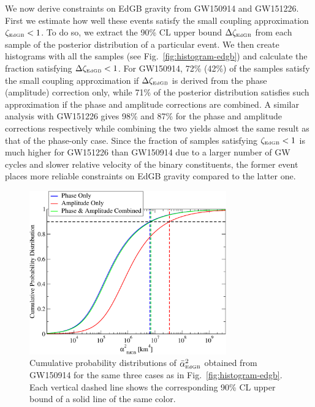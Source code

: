 \documentclass[prd,twocolumn,nofootinbib]{revtex4-1}
\newcommand{\EDGB}{{\mbox{\tiny EdGB}}}
\begin{document}
We now derive constraints on EdGB gravity from GW150914 and GW151226. First we estimate how well these events satisfy the small coupling approximation $\zeta_{\EDGB}<1$. To do so, we extract the 90\% CL upper bound $\Delta\zeta_{\EDGB}$ from each sample of the posterior distribution of a particular event. We then create histograms with all the samples (see Fig.~\ref{fig:histogram-edgb}) and calculate the fraction satisfying $\Delta\zeta_{\EDGB}<1$.  For GW150914, 72\% (42\%) of the samples satisfy the small coupling approximation if $\Delta\zeta_{\EDGB}$ is derived from the phase (amplitude) correction only, while 71\% of the posterior distribution satisfies such approximation if the phase and amplitude corrections are combined. A similar analysis with GW151226 gives 98\% and 87\% for the phase and amplitude corrections respectively while combining the two yields almost the same result as that of the phase-only case. Since the fraction of samples satisfying $\zeta_{\EDGB}<1$ is much higher for GW151226 than GW150914 due to a larger number of GW cycles and slower relative velocity of the binary constituents, the former event places more reliable constraints on EdGB gravity compared to the latter one.


\begin{figure}[htb]
\includegraphics[width=8.5cm]{edgb-gw150914.pdf}
\caption{Cumulative probability distributions of $\bar{\alpha}^2_{\EDGB}$ obtained from GW150914 for the same three cases as in Fig.~\ref{fig:histogram-edgb}. Each vertical dashed line shows the corresponding 90\% CL upper bound of a solid line of the same color.}
\label{fig:pdf-edgb}
\end{figure}
\end{document}
